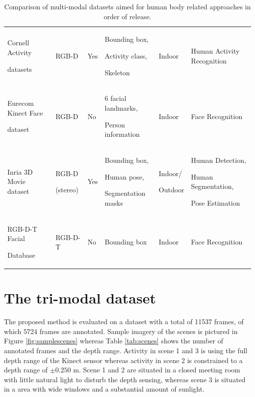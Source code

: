 \documentclass[10pt,twocolumn,letterpaper]{article}
\begin{document}
\begin{table}[htpb]
\begin{tabular}{p{4cm}p{1.5cm}p{0.7cm}p{3cm}p{1.2cm}p{4.1cm}}
Cornell Activity \par datasets \cite{koppula2013learning}\strut	&	RGB-D	&	Yes	&	Bounding box, \par Activity class,\strut \par Skeleton\strut	&	Indoor	&	Human Activity Recognition \\
Eurecom Kinect Face \par dataset \cite{huynh2013efficient}\strut	&	RGB-D	&	No	&	6 facial landmarks, \par Person information\strut	&	Indoor	&	Face Recognition \\
Inria 3D Movie dataset \cite{alahari2013pose}	&	RGB-D \par(stereo)\strut 	&	Yes	&	Bounding box, \par Human pose,\strut \par Segmentation masks\strut	&	Indoor/ \par Outdoor\strut	&	Human Detection, \par Human Segmentation,\strut \par Pose Estimation\strut \\
RGB-D-T Facial \par Database \cite{nikisinsrgb}\strut &	RGB-D-T	&	No	&	Bounding box	&	Indoor	&	Face Recognition \\
\hline
\end{tabular}
\caption{Comparison of multi-modal datasets aimed for human body related approaches in order of release.}
\label{tab:datasets}
\end{table}
 
\section{The tri-modal dataset}
\label{sec:dataset}

The proposed method is evaluated on a dataset with a total of 11537 frames, of which 5724 frames are annotated. Sample imagery of the scenes is pictured in Figure \ref{fig:samplescenes} whereas Table \ref{tab:scenes} shows the number of annotated frames and the depth range. Activity in scene 1 and 3 is using the full depth range of the Kinect sensor whereas activity in scene 2 is constrained to a depth range of $\pm 0.250$ m. Scene 1 and 2 are situated in a closed meeting room with little natural light to disturb the depth sensing, whereas scene 3 is situated in a area with wide windows and a substantial amount of sunlight.
\end{document}
